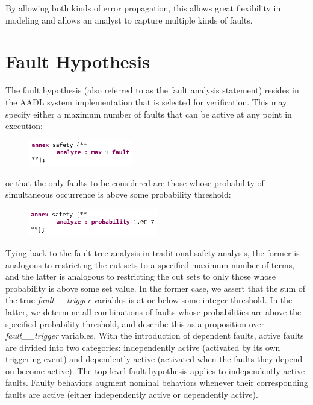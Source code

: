 By allowing both kinds of error propagation, this allows great flexibility in modeling and allows an analyst to capture multiple kinds of faults. 


\section{Fault Hypothesis}
The fault hypothesis (also referred to as the fault analysis statement) resides in the AADL system implementation that is selected for verification. This may specify either a maximum number of faults that can be active at any point in execution:

\begin{figure}[h!]
	\vspace{-0.1in}
		\includegraphics[width=0.4\textwidth]{images/hypothesisMaxN.png}
	\vspace{-0.1in}
	\label{fig:hypothesisMaxN}
\end{figure}
or that the only faults to be considered are those whose probability of simultaneous occurrence is above some probability threshold: 

\begin{figure}[h!]
	\vspace{-0.1in}
		\includegraphics[width=0.5\textwidth]{images/hypothesisProb.png}
	\vspace{-0.1in}
\end{figure}

Tying back to the fault tree analysis in traditional safety analysis, the former is analogous to restricting the cut sets to a specified maximum number of terms, and the latter is analogous to restricting the cut sets to only those whose probability is above some set value. In the former case, we assert that the sum of the true {\em fault\_\_trigger} variables is at or below some integer threshold.  In the latter, we determine all combinations of faults whose probabilities are above the specified probability threshold, and describe this as a proposition over {\em fault\_\_trigger} variables. 
%
With the introduction of dependent faults, active faults are divided into two categories: independently active (activated by its own triggering event) and dependently active (activated when the faults they depend on become active). The top level fault hypothesis applies to independently active faults. Faulty behaviors augment nominal behaviors whenever their corresponding faults are active (either independently active or dependently active).










